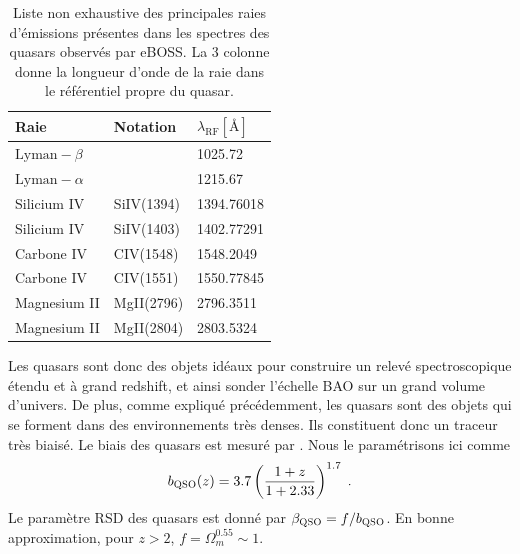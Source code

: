 \documentclass[11pt, twoside, a4paper, openright]{report}
\begin{document}
\begin{table}[]
  \centering
  \caption{Liste non exhaustive des principales raies d'émissions présentes dans les spectres des quasars observés par eBOSS. La 3 colonne donne la longueur d'onde de la raie dans le référentiel propre du quasar.}
  \label{tab:raies}
  \begin{tabular}{lll}
    \toprule
    Raie & Notation & $\lambda_{\mathrm{\mathrm{RF}}} [\si{\angstrom}]$ \\
    \midrule
    $\mathrm{Lyman-}\beta$ & \lyb{}  & \num{1025.72} \\
    $\mathrm{Lyman-}\alpha$ & \lya{} & \num{1215.67} \\
    Silicium IV & SiIV(1394) & \num{1394.76018} \\
    Silicium IV & SiIV(1403) & \num{1402.77291} \\
    Carbone IV & CIV(1548) & \num{1548.2049} \\
    Carbone IV & CIV(1551) & \num{1550.77845} \\
    Magnesium II & MgII(2796) & \num{2796.3511} \\
    Magnesium II & MgII(2804) & \num{2803.5324}\\
    \bottomrule
  \end{tabular}
\end{table}

Les quasars sont donc des objets idéaux pour construire un relevé spectroscopique étendu et à grand redshift, et ainsi sonder l'échelle BAO sur un grand volume d'univers. De plus, comme expliqué précédemment, les quasars sont des objets qui se forment dans des environnements très denses. Ils constituent donc un traceur très biaisé. Le biais des quasars est mesuré par \textcite{Laurent2017}. Nous le paramétrisons ici comme
\begin{equation}
  \label{eq:b_qso}
b_{\textsc{QSO}}(z) = \num{3.7} \left(\frac{1+z}{1+\num{2.33}}\right)^{\num{1.7}}  \; .
\end{equation} 
Le paramètre RSD des quasars est donné par $\beta_{\textsc{QSO}} = f / b_{\textsc{QSO}}$. En bonne approximation, pour $z > 2$, $f = \Omega_m^{\num{0.55}} \sim 1$. 
\end{document}
